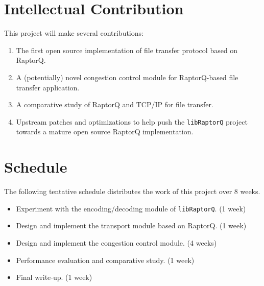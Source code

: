 \documentclass{sig-alternate-10pt}
\begin{document}
\section{Intellectual Contribution}

This project will make several contributions:
\begin{enumerate}
  \item The first open source implementation of file transfer protocol based on
  RaptorQ.
  \item A (potentially) novel congestion control module for RaptorQ-based file
  transfer application.
  \item A comparative study of RaptorQ and TCP/IP for file transfer.
  \item Upstream patches and optimizations to help push the \texttt{libRaptorQ}
  project towards a mature open source RaptorQ implementation.
\end{enumerate}

\section{Schedule}

The following tentative schedule distributes the work of this project over 8 weeks.
\begin{itemize}
  \item Experiment with the encoding/decoding module of \texttt{libRaptorQ}. (1 week)
  \item Design and implement the transport module based on RaptorQ. (1 week)
  \item Design and implement the congestion control module. (4 weeks)
  \item Performance evaluation and comparative study. (1 week)
  \item Final write-up. (1 week)
\end{itemize}



\end{document}
